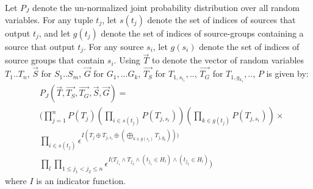 \documentclass{sig-alternate}
\newcounter{prob}
\begin{document}
Let $P_J$ denote the un-normalized joint probability distribution over all random variables. For any tuple $t_j$, let $s(t_j)$ denote the set of indices of sources that output $t_j$, and let $g(t_j)$ denote the set of indices of source-groups containing a source that output $t_j$. For any source $s_i$, let $g(s_i)$ denote the set of indices of source groups that contain $s_i$. 
Using $\overrightarrow{T}$ to denote the vector of random variables $T_1..T_n$, $\overrightarrow{S}$ for $S_1..S_m$, $\overrightarrow{G}$ for $G_1, ... G_k$, $\overrightarrow{T_S}$ for $T_{1, s_{i_1}}, ..$, $\overrightarrow{T_G}$ for $T_{1, g_{k_1}}, ..$, $P$ is given by:
\begin{align*} 
& P_J(\overrightarrow{T}, \overrightarrow{T_S}, \overrightarrow{T_G}, \overrightarrow{S}, \overrightarrow{G}) =
\\& (\prod_{j=1}^{n} P(T_j) (\prod_{i\in s(t_j)} P(T_{j, s_i})) (\prod_{k\in g(t_j)} P(T_{j, s_i})) \times 
\\& \prod_{i\in s(t_j)} \epsilon^{I(T_j \oplus T_{j, s_i} \oplus(\bigoplus_{k\in g(s_i)} T_{j, g_k})))}
\\& \prod_{l} \prod_{1 \leq j_1 < j_2 \leq n} \epsilon^{I(T_{j_1} \land T_{j_2} \land (t_{j_1}\in H_l) \land (t_{j_2} \in H_l)})
\end{align*}
where $I$ is an indicator function.

\end{document}
